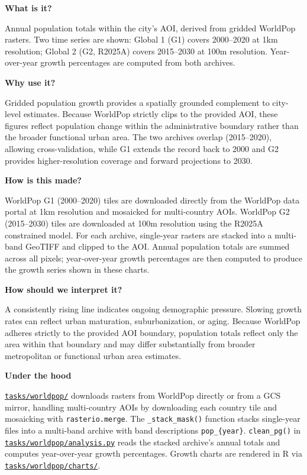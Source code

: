 \documentclass[
  letterpaper,
  DIV=11,
  numbers=noendperiod]{scrreprt}
\begin{document}
\textbf{What is it?}

Annual population totals within the city's AOI, derived from gridded
WorldPop rasters. Two time series are shown: Global 1 (G1) covers
2000--2020 at 1km resolution; Global 2 (G2, R2025A) covers 2015--2030 at
100m resolution. Year-over-year growth percentages are computed from
both archives.

\textbf{Why use it?}

Gridded population growth provides a spatially grounded complement to
city-level estimates. Because WorldPop strictly clips to the provided
AOI, these figures reflect population change within the administrative
boundary rather than the broader functional urban area. The two archives
overlap (2015--2020), allowing cross-validation, while G1 extends the
record back to 2000 and G2 provides higher-resolution coverage and
forward projections to 2030.

\textbf{How is this made?}

WorldPop G1 (2000--2020) tiles are downloaded directly from the WorldPop
data portal at 1km resolution and mosaicked for multi-country AOIs.
WorldPop G2 (2015--2030) tiles are downloaded at 100m resolution using
the R2025A constrained model. For each archive, single-year rasters are
stacked into a multi-band GeoTIFF and clipped to the AOI. Annual
population totals are summed across all pixels; year-over-year growth
percentages are then computed to produce the growth series shown in
these charts.

\textbf{How should we interpret it?}

A consistently rising line indicates ongoing demographic pressure.
Slowing growth rates can reflect urban maturation, suburbanization, or
aging. Because WorldPop adheres strictly to the provided AOI boundary,
population totals reflect only the area within that boundary and may
differ substantially from broader metropolitan or functional urban area
estimates.

\textbf{Under the hood}

\href{../tasks/worldpop/}{\texttt{tasks/worldpop/}} downloads rasters
from WorldPop directly or from a GCS mirror, handling multi-country AOIs
by downloading each country tile and mosaicking with
\texttt{rasterio.merge}. The \texttt{\_stack\_mask()} function stacks
single-year files into a multi-band archive with band descriptions
\texttt{pop\_\{year\}}. \texttt{clean\_pg()} in
\href{../tasks/worldpop/analysis.py}{\texttt{tasks/worldpop/analysis.py}}
reads the stacked archive's annual totals and computes year-over-year
growth percentages. Growth charts are rendered in R via
\href{../tasks/worldpop/charts/}{\texttt{tasks/worldpop/charts/}}.
\end{document}
